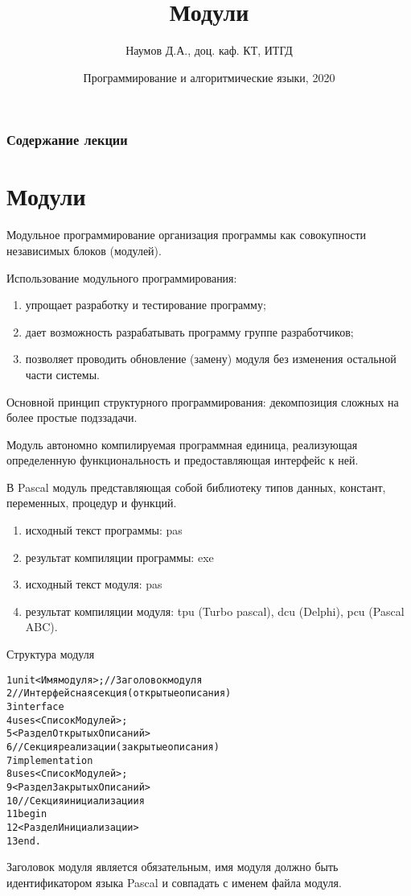 \documentclass{beamer}
\title[Модули]{Модули}
\author{Наумов Д.А., доц. каф. КТ, ИТГД }
\date[01.04.2020] {Программирование и алгоритмические языки, 2020}
\begin{document}
\begin{frame}
  \titlepage
\end{frame}
  
\begin{frame}
  \frametitle{Содержание лекции}
  \tableofcontents  
\end{frame}
  
\section{Модули}

\begin{frame}
\begin{block}{Модульное программирование}
организация программы как совокупности независимых блоков (модулей).
\end{block}
Использование модульного программирования:
\begin{enumerate}
\item упрощает разработку и тестирование программу;
\item дает возможность разрабатывать программу группе разработчиков;
\item позволяет проводить обновление (замену) модуля без изменения остальной части системы.
\end{enumerate}
Основной принцип структурного программирования: декомпозиция сложных на более простые подззадачи.
\end{frame} 

\begin{frame}
\begin{block}{Модуль}
автономно компилируемая программная единица, реализующая определенную функциональность
и предоставляющая интерфейс к ней.
\end{block}
В Pascal модуль представляющая собой библиотеку типов данных, констант, переменных, процедур и функций.
\begin{enumerate}
\item исходный текст программы: pas
\item результат компиляции программы: exe
\item исходный текст модуля: pas
\item результат компиляции модуля: tpu (Turbo pascal), dcu (Delphi), pcu (Pascal ABC).
\end{enumerate}
\end{frame} 

\begin{frame}[fragile]{Структура модуля}
\begin{alltt}
 1 unit <Имя модуля>;//Заголовок модуля 	
 2 //Интерфейсная секция (открытые описания)
 3   interface 
 4	    uses <СписокМодулей>; 
 5	    <РазделОткрытыхОписаний>
 6 //Секция реализации (закрытые описания)
 7   implementation 
 8	    uses <СписокМодулей>;  
 9	    <РазделЗакрытыхОписаний>
10 //Секция инициализациия
11   begin
12	    <РазделИнициализации>
13   end.
\end{alltt}
Заголовок модуля является обязательным, имя модуля должно быть идентификатором языка Pascal и совпадать с именем файла модуля.
\end{frame}
\end{document}
